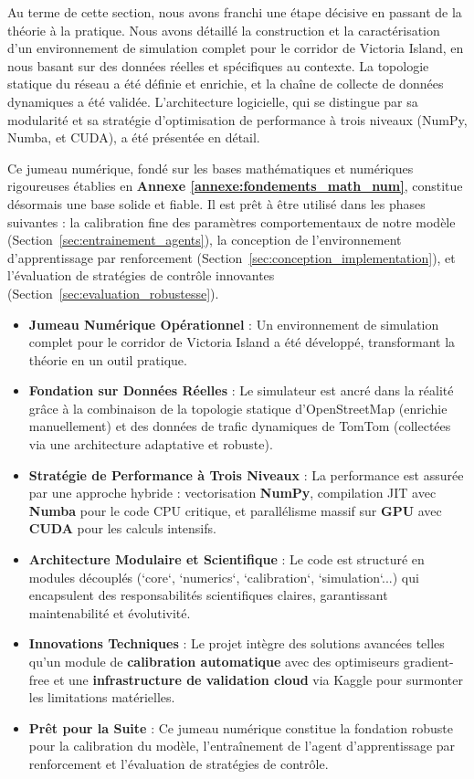Au terme de cette section, nous avons franchi une étape décisive en passant de la théorie à la pratique. Nous avons détaillé la construction et la caractérisation d'un environnement de simulation complet pour le corridor de Victoria Island, en nous basant sur des données réelles et spécifiques au contexte. La topologie statique du réseau a été définie et enrichie, et la chaîne de collecte de données dynamiques a été validée. L'architecture logicielle, qui se distingue par sa modularité et sa stratégie d'optimisation de performance à trois niveaux (NumPy, Numba, et CUDA), a été présentée en détail.

Ce jumeau numérique, fondé sur les bases mathématiques et numériques rigoureuses établies en \textbf{Annexe \ref{annexe:fondements_math_num}}, constitue désormais une base solide et fiable. Il est prêt à être utilisé dans les phases suivantes : la calibration fine des paramètres comportementaux de notre modèle (Section~\ref{sec:entrainement_agents}), la conception de l'environnement d'apprentissage par renforcement (Section~\ref{sec:conception_implementation}), et l'évaluation de stratégies de contrôle innovantes (Section~\ref{sec:evaluation_robustesse}).

\begin{keypointsbox}
       \begin{itemize}
              \item \textbf{Jumeau Numérique Opérationnel} : Un environnement de simulation complet pour le corridor de Victoria Island a été développé, transformant la théorie en un outil pratique.
              \item \textbf{Fondation sur Données Réelles} : Le simulateur est ancré dans la réalité grâce à la combinaison de la topologie statique d'OpenStreetMap (enrichie manuellement) et des données de trafic dynamiques de TomTom (collectées via une architecture adaptative et robuste).
              \item \textbf{Stratégie de Performance à Trois Niveaux} : La performance est assurée par une approche hybride : vectorisation \textbf{NumPy}, compilation JIT avec \textbf{Numba} pour le code CPU critique, et parallélisme massif sur \textbf{GPU} avec \textbf{CUDA} pour les calculs intensifs.
              \item \textbf{Architecture Modulaire et Scientifique} : Le code est structuré en modules découplés (`core`, `numerics`, `calibration`, `simulation`...) qui encapsulent des responsabilités scientifiques claires, garantissant maintenabilité et évolutivité.
              \item \textbf{Innovations Techniques} : Le projet intègre des solutions avancées telles qu'un module de \textbf{calibration automatique} avec des optimiseurs gradient-free et une \textbf{infrastructure de validation cloud} via Kaggle pour surmonter les limitations matérielles.
              \item \textbf{Prêt pour la Suite} : Ce jumeau numérique constitue la fondation robuste pour la calibration du modèle, l'entraînement de l'agent d'apprentissage par renforcement et l'évaluation de stratégies de contrôle.
       \end{itemize}
\end{keypointsbox}

